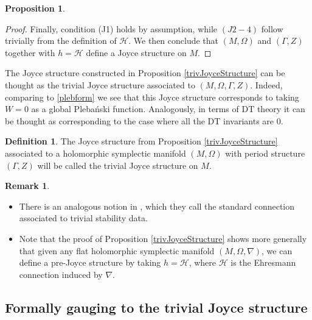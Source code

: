 \documentclass{article}
\theoremstyle{definition}
\newtheorem{definition}[theorem]{Definition}
\newtheorem{remark}[theorem]{Remark}
\newtheorem{proposition}[theorem]{Proposition}
\numberwithin{equation}{section}
\begin{document}
\begin{proposition}
\begin{proof}
    Finally, condition (J1) holds by assumption, while $(J2-4)$ follow trivially from the definition of $\mathcal{H}$. We then conclude that $(M,\Omega)$ and $(\Gamma,Z)$ together with $h=\mathcal{H}$ define a Joyce structure on $M$.    
\end{proof}

The Joyce structure constructed in Proposition \ref{trivJoyceStructure} can be thought as the trivial Joyce structure associated to $(M,\Omega,\Gamma,Z)$. Indeed, comparing to \eqref{plebform} we see that this Joyce structure corresponds to taking $W=0$ as a global Pleba\'nski function. Analogously, in terms of DT theory it can be thought as corresponding to the case where all the DT invariants are $0$.
\end{proposition}
\begin{definition}
    The Joyce structure from Proposition \ref{trivJoyceStructure} associated to a holomorphic symplectic manifold $(M,\Omega)$ with period structure $(\Gamma,Z)$ will be called the trivial Joyce structure on $M$.
\end{definition}
\begin{remark}
\begin{itemize}
\item There is an analogous notion in \cite[Section 5.1]{KSresurgence}, which they call the standard connection associated to trivial stability data. 
\item Note that the proof of Proposition \ref{trivJoyceStructure} shows more generally that given any flat holomorphic symplectic manifold $(M,\Omega,\nabla)$, we can define a pre-Joyce structure by taking $h=\mathcal{H}$, where $\mathcal{H}$ is the Ehresmann connection induced by $\nabla$.
\end{itemize}

\end{remark}
\subsection{Formally gauging to the trivial Joyce structure}
\end{document}
